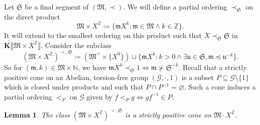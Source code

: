 \documentclass{article}
\newcommand{\assign}{\coloneqq}
\newcommand{\suchthat}{:}
\newtheorem{lemma}[theorem]{Lemma}
\theoremstyle{remark}\newtheorem*{convention*}{Convention}
\begin{document}
Let $\mathfrak{S}$ be a final segment of $(\mathfrak{M}, \prec)$. We will
define a partial ordering $\prec_{\mathfrak{S}}$ on the direct product
\[ \mathfrak{M} \times X^{\mathbb{Z}} \assign \{\mathfrak{m}X^k \suchthat
   \mathfrak{m} \in \mathfrak{M} \wedge k \in \mathbb{Z}\} . \]
It will extend to the smallest ordering on this product such that $X
\prec_{\mathfrak{S}} \mathfrak{S}$ in $\mathbf{K} \llbracket \mathfrak{M}
\times X^{\mathbb{Z}} \rrbracket$. Consider the subclass
\begin{equation}
  (\mathfrak{M} \times X^{\mathbb{Z}})^{\prec, \mathfrak{S}} \assign
  (\mathfrak{M}^{\prec} \times \{X^0 \}) \sqcup \{\mathfrak{m}X^k \suchthat k
  > 0 \wedge \exists \mathfrak{u} \in \mathfrak{S}, \mathfrak{m} \preccurlyeq
  \mathfrak{u}^{- k} \} \label{eq-negative-cone} .
\end{equation}
So for $(\mathfrak{m}, k) \in \mathfrak{M} \times \mathbb{N}$, we have
$\mathfrak{m}X^k \prec_{\mathfrak{S}} 1 \Longleftrightarrow \mathfrak{m}
\nsucc \mathfrak{S}^{- k}$. Recall that a strictly positive cone on an
Abelian, torsion-free group $(\mathcal{G}, \cdot, 1)$ is a subset $P \subseteq
\mathcal{G} \setminus \{1\}$ which is closed under products and such that $P
\cap P^{- 1} = \varnothing$. Such a cone induces a partial ordering $<_P$ on
$\mathcal{G}$ given by $f <_P g \Longleftrightarrow gf^{- 1} \in P$.

\begin{lemma}
  The class $(\mathfrak{M} \times X^{\mathbb{Z}})^{\prec, \mathfrak{S}}$ is a
  strictly positive cone on $\mathfrak{M} \cdot X^{\mathbb{Z}}$.
\end{lemma}
\end{document}
